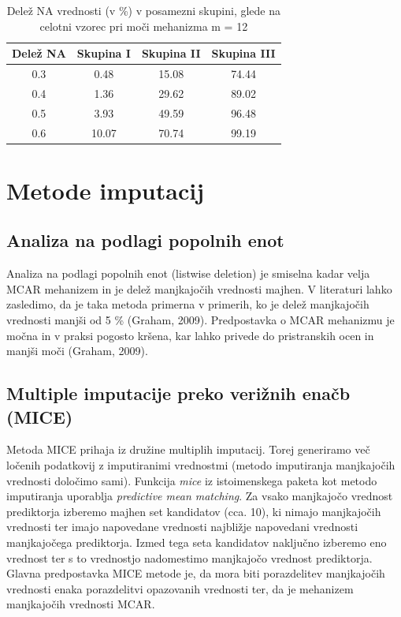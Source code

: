 \documentclass[12pt,a4paper]{article}
\begin{document}
	
\begin{table}[ht]
	\begin{tabular}{cccc}
		Delež NA & Skupina I & Skupina II  &  Skupina III  \\
		\hline
    0.3 & 0.48 & 15.08 & 74.44\\
    0.4 & 1.36 & 29.62 & 89.02\\
    0.5 & 3.93 & 49.59 & 96.48\\
    0.6 & 10.07 & 70.74 & 99.19\\
	\end{tabular}
	\caption{Delež NA vrednosti (v \%) v posamezni skupini, glede na celotni vzorec pri moči mehanizma m = 12}
	\label{tab:4}
\end{table}


\pagebreak

\section{Metode imputacij}

\subsection{Analiza na podlagi popolnih enot}
Analiza na podlagi popolnih enot (listwise deletion) je smiselna kadar velja MCAR mehanizem in je delež manjkajočih vrednosti majhen. V literaturi lahko zasledimo, da je taka metoda primerna v primerih, ko je delež manjkajočih vrednosti manjši od 5 \% (Graham, 2009). Predpostavka o MCAR mehanizmu je močna in v praksi pogosto kršena, kar lahko privede do pristranskih ocen in manjši moči (Graham, 2009).



\subsection{Multiple imputacije preko verižnih enačb (MICE)}
Metoda MICE prihaja iz družine multiplih imputacij. Torej generiramo več ločenih podatkovij z imputiranimi vrednostmi (metodo imputiranja manjkajočih vrednosti določimo sami). Funkcija \emph{mice} iz istoimenskega paketa kot metodo imputiranja uporablja \emph{predictive mean matching}. Za vsako manjkajočo vrednost prediktorja izberemo majhen set kandidatov (cca. 10), ki nimajo manjkajočih vrednosti ter imajo napovedane vrednosti najbližje napovedani vrednosti manjkajočega prediktorja. Izmed tega seta kandidatov naključno izberemo eno vrednost ter s to vrednostjo nadomestimo manjkajočo vrednost prediktorja. Glavna predpostavka MICE metode je, da mora biti porazdelitev manjkajočih vrednosti enaka porazdelitvi opazovanih vrednosti ter, da je mehanizem manjkajočih vrednosti MCAR. 
\end{document}
